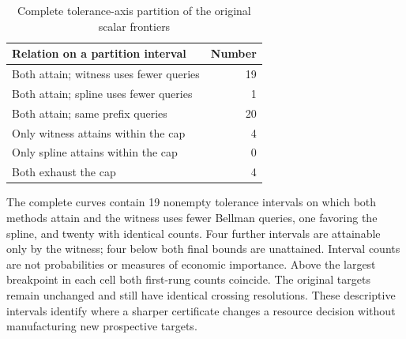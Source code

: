 \begin{table}[htbp]\centering
\caption{Complete tolerance-axis partition of the original scalar frontiers}\label{tab:frontier47}
\begin{tabular}{lr}\toprule Relation on a partition interval & Number\\\midrule
Both attain; witness uses fewer queries & 19 \\
Both attain; spline uses fewer queries & 1 \\
Both attain; same prefix queries & 20 \\
Only witness attains within the cap & 4 \\
Only spline attains within the cap & 0 \\
Both exhaust the cap & 4 \\
\bottomrule\end{tabular}\end{table}

The complete curves contain 19 nonempty tolerance intervals on which both methods attain and the witness uses fewer Bellman queries, one favoring the spline, and twenty with identical counts. Four further intervals are attainable only by the witness; four below both final bounds are unattained. Interval counts are not probabilities or measures of economic importance. Above the largest breakpoint in each cell both first-rung counts coincide. The original targets remain unchanged and still have identical crossing resolutions. These descriptive intervals identify where a sharper certificate changes a resource decision without manufacturing new prospective targets.
